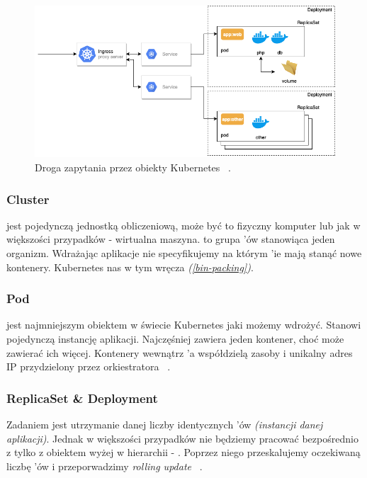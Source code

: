 \begin{figure}[!ht]
	\begin{center}
		\includegraphics[width=1\textwidth]{img/k8s-objects}
	\end{center}
	\caption{Droga zapytania przez obiekty Kubernetes ~\cite{k8s-diagram}.}
\end{figure}

\subsubsection{Cluster}
 jest pojedynczą jednostką obliczeniową, może być to fizyczny komputer lub jak w większości przypadków - wirtualna maszyna. 
 to grupa 'ów stanowiąca jeden organizm. 
Wdrażając aplikacje nie specyfikujemy na którym 'ie mają stanąć nowe kontenery. Kubernetes nas w tym wręcza \emph{(\ref{bin-packing})}.

\subsubsection{Pod}
 jest najmniejszym obiektem w świecie Kubernetes jaki możemy wdrożyć. Stanowi pojedynczą instancję aplikacji. 
Najczęśniej zawiera jeden kontener, choć może zawierać ich więcej. 
Kontenery wewnątrz 'a współdzielą zasoby i unikalny adres IP przydzielony przez orkiestratora ~\cite{k8s-cpts}.

\subsubsection{ReplicaSet \& Deployment}
Zadaniem  jest utrzymanie danej liczby identycznych 'ów \emph{(instancji danej aplikacji)}.
Jednak w większości przypadków nie będziemy pracować bezpośrednio z  tylko z obiektem wyżej w hierarchii - .
Poprzez niego przeskalujemy oczekiwaną liczbę 'ów i przeporwadzimy \emph{rolling update} ~\cite{k8s-cpts}.


